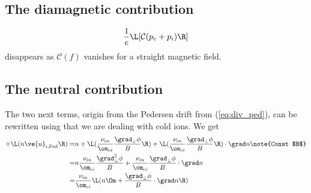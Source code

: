 \subsection{The diamagnetic contribution}
%
\begin{align*}
    \frac{1}{e}\L[\mathcal{C}(p_e+p_i)\R]
\end{align*}
%
disappears as $\mathcal{C}(f)$ vanishes for a straight magnetic field.


\subsection{The neutral contribution}
%
The two next terms, origin from the Pedersen drift from (\ref{eq:div_ped}),
can be rewritten using that we are dealing with cold ions. We get
%
\begin{align*}
    \div\L(n\ve{u}_{i,\text{Ped}} \R)
    =&
    n \div\L(\frac{\nu_{in}}{\om_{ci}} \frac{\grad_\perp \phi}{B} \R)
    + \L(\frac{\nu_{in}}{\om_{ci}} \frac{\grad_\perp \phi}{B} \R) \cdot\grad n
    \note{Const $B$}
    \\
%
%
    =&
    n \frac{\nu_{in}}{\om_{ci}} \frac{\grad_\perp^2 \phi}{B}
    + \frac{\nu_{in}}{\om_{ci}} \frac{\grad_\perp \phi}{B} \cdot\grad n
    \\
%
%
  = &
 \frac{\nu_{in}}{\om_{ci}} \L(n\Om + \frac{\grad_\perp \phi}{B} \cdot \grad n\R)
\end{align*}
%


